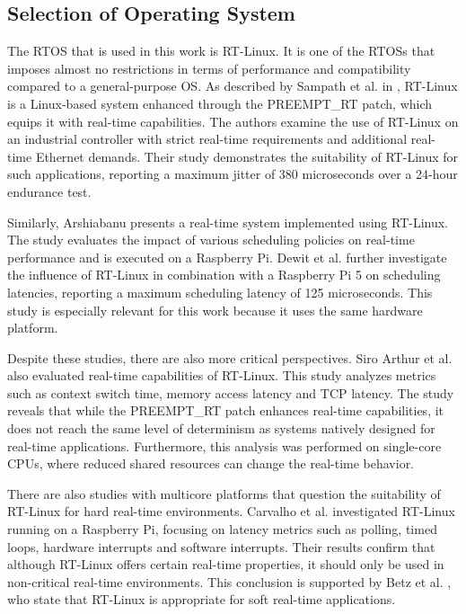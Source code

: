 \subsection{Selection of Operating System}
The \ac{RTOS} that is used in this work is RT-Linux.
It is one of the \acp{RTOS} that imposes almost no restrictions in terms of performance and compatibility compared to a general-purpose \ac{OS}.
As described by Sampath et al. in \cite{Sampath_2007}, RT-Linux is a Linux-based system enhanced through the PREEMPT\_RT patch, which equips it with real-time capabilities. 
The authors examine the use of RT-Linux on an industrial controller with strict real-time requirements and additional real-time Ethernet demands. 
Their study demonstrates the suitability of RT-Linux for such applications, reporting a maximum jitter of 380 microseconds over a 24-hour endurance test.

Similarly, Arshiabanu \cite{ARSHIABANU_2014} presents a real-time system implemented using RT-Linux. 
The study evaluates the impact of various scheduling policies on real-time performance and is executed on a Raspberry Pi. 
Dewit et al. \cite{ae11aecebd4e4fd6896d0b8bb93fa73a} further investigate the influence of RT-Linux in combination with a Raspberry Pi 5 on scheduling latencies, reporting a maximum scheduling latency of 125 microseconds.
This study is especially relevant for this work because it uses the same hardware platform.

Despite these studies, there are also more critical perspectives. 
Siro Arthur et al. \cite{Siro_2007} also evaluated real-time capabilities of RT-Linux. 
This study analyzes metrics such as context switch time, memory access latency and TCP latency. 
The study reveals that while the PREEMPT\_RT patch enhances real-time capabilities, it does not reach the same level of determinism as systems natively designed for real-time applications. 
Furthermore, this analysis was performed on single-core CPUs, where reduced shared resources can change the real-time behavior. 

There are also studies with multicore platforms that question the suitability of RT-Linux for hard real-time environments. 
Carvalho et al. \cite{9018464} investigated RT-Linux running on a Raspberry Pi, focusing on latency metrics such as polling, timed loops, hardware interrupts and software interrupts. 
Their results confirm that although RT-Linux offers certain real-time properties, it should only be used in non-critical real-time environments. 
This conclusion is supported by Betz et al. \cite{5347056}, who state that RT-Linux is appropriate for soft real-time applications.

